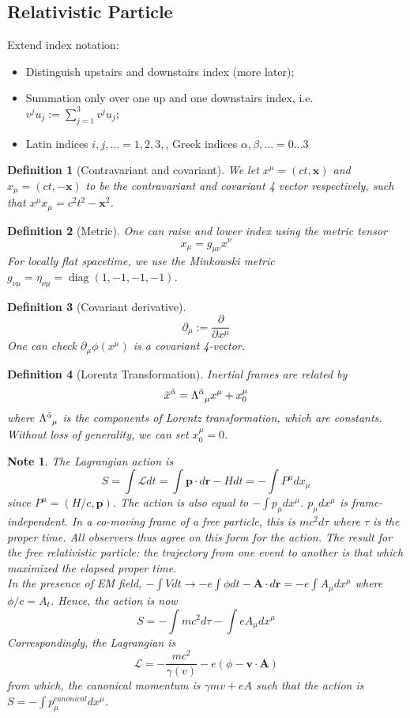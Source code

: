 \documentclass[a4paper]{article}
\DeclareMathOperator{\diag}{diag}
\newtheorem{defi}{Definition}[section]
\newtheorem{note}{Note}[section]
\theoremstyle{new}
\begin{document}
\subsection{Relativistic Particle}
Extend index notation:
\begin{itemize}
    \item Distinguish upstairs and downstairs index (more later);
    \item Summation only over one up and one downstairs index, i.e. $v^ju_j:=\sum_{j=1}^3v^ju_j$;
    \item Latin indices $i,j,...=1,2,3,$, Greek indices $\alpha,\beta,...=0...3$
\end{itemize}
\begin{defi}[Contravariant and covariant]
We let $x^\mu=(ct,\mathbf{x})$ and $x_\mu=(ct,-\mathbf{x})$ to be the contravariant and covariant 4 vector respectively, such that $x^\mu x_\mu=c^2t^2-\mathbf{x}^2$. 
\end{defi}
\begin{defi}[Metric]
One can raise and lower index using the metric tensor
$$x_\mu=g_{\mu\nu}x^\nu$$
For locally flat spacetime, we use the Minkowski metric $g_{\nu\mu}=\eta_{\nu\mu}=\diag(1,-1,-1,-1)$.
\end{defi}
\begin{defi}[Covariant derivative]
$$\partial_\mu:=\frac{\partial}{\partial x^\mu}$$
One can check $\partial_\mu\phi(x^\mu)$ is a covariant 4-vector.
\end{defi}
\begin{defi}[Lorentz Transformation]
Inertial frames are related by 
$$\tilde{x}^{\tilde{\alpha}}=\tensor*{\Lambda}{*_{}^{\tilde{\alpha}}_{\mu}}x^\mu+x^\mu_0$$
where $\tensor*{\Lambda}{*_{}^{\tilde{\alpha}}_{\mu}}$ is the components of Lorentz transformation, which are constants. Without loss of generality, we can set $x_0^\mu=0$.
\end{defi}
\begin{note}
The Lagrangian action is
$$S=\int\mathcal{L}dt=\int\mathbf{p}\cdot d\mathbf{r}-Hdt=-\int P^\mu dx_\mu$$
since $P^\mu=(H/c,\mathbf{p})$. The action is also equal to $-\int p_\mu dx^\mu$. $p_\mu dx^\mu$ is frame-independent. In a co-moving frame of a free particle, this is $mc^2d\tau$ where $\tau$ is the proper time. All observers thus agree on this form for the action. The result for the free relativistic particle: the trajectory from one event to another is that which maximized the elapsed proper time.\\[5pt]
In the presence of EM field, $-\int Vdt\rightarrow -e\int\phi dt-\mathbf{A}\cdot d\mathbf{r}=-e\int A_\mu dx^\mu$ where $\phi/c=A_t$. Hence, the action is now
$$S=-\int mc^2d\tau-\int eA_\mu dx^\mu$$
Correspondingly, the Lagrangian is
$$\mathcal{L}=-\frac{mc^2}{\gamma(v)}-e(\phi-\mathbf{v}\cdot\mathbf{A})$$
from which, the canonical momentum is $\gamma mv+eA$ such that the action is $S=-\int p^{canonical}_\mu dx^\mu$.
\end{note}
\end{document}
